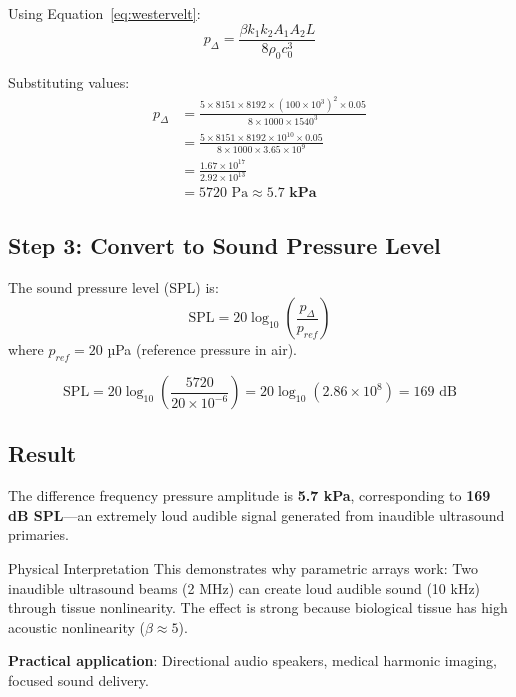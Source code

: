 Using Equation~\eqref{eq:westervelt}:
\begin{equation}
p_{\Delta} = \frac{\beta k_1 k_2 A_1 A_2 L}{8\rho_0 c_0^3}
\end{equation}

Substituting values:
\begin{align}
p_{\Delta} &= \frac{5 \times 8151 \times 8192 \times (100 \times 10^3)^2 \times 0.05}{8 \times 1000 \times 1540^3} \\
&= \frac{5 \times 8151 \times 8192 \times 10^{10} \times 0.05}{8 \times 1000 \times 3.65 \times 10^9} \\
&= \frac{1.67 \times 10^{17}}{2.92 \times 10^{13}} \\
&= 5720 \text{ Pa} \approx \mathbf{5.7 \text{ kPa}}
\end{align}

\subsection*{Step 3: Convert to Sound Pressure Level}

The sound pressure level (SPL) is:
\begin{equation}
\text{SPL} = 20\log_{10}\left(\frac{p_{\Delta}}{p_{ref}}\right)
\end{equation}
where $p_{ref} = 20$ µPa (reference pressure in air).

\begin{equation}
\text{SPL} = 20\log_{10}\left(\frac{5720}{20 \times 10^{-6}}\right) = 20\log_{10}(2.86 \times 10^8) = 169 \text{ dB}
\end{equation}

\subsection*{Result}

The difference frequency pressure amplitude is \textbf{5.7 kPa}, corresponding to \textbf{169 dB SPL}---an extremely loud audible signal generated from inaudible ultrasound primaries.

\begin{calloutbox}{Physical Interpretation}
This demonstrates why parametric arrays work: Two inaudible ultrasound beams (2 MHz) can create loud audible sound (10 kHz) through tissue nonlinearity. The effect is strong because biological tissue has high acoustic nonlinearity ($\beta \approx 5$).

\textbf{Practical application}: Directional audio speakers, medical harmonic imaging, focused sound delivery.
\end{calloutbox}

